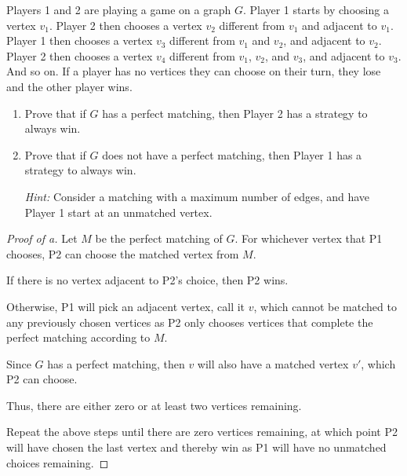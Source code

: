 \documentclass[../hw6]{subfiles}
\begin{document}
\begin{problem}
Players 1 and 2 are playing a game on a graph $G$. Player 1 starts by choosing a vertex $v_1$. Player 2 then chooses a vertex $v_2$ different from $v_1$ and adjacent to $v_1$. Player 1 then chooses a vertex $v_3$ different from $v_1$ and $v_2$, and adjacent to $v_2$. Player 2 then chooses a vertex $v_4$ different from $v_1$, $v_2$, and $v_3$, and adjacent to $v_3$. And so on. If a player has no vertices they can choose on their turn, they lose and the other player wins.
\begin{enumerate}
	\item Prove that if $G$ has a perfect matching, then Player 2 has a strategy to always win.
	\item Prove that if $G$ does not have a perfect matching, then Player 1 has a strategy to always win.

	      \emph{Hint:} Consider a matching with a maximum number of edges, and have Player 1 start at an unmatched vertex.
\end{enumerate}
\end{problem}
\begin{proof}[Proof of a]
	Let $M$ be the perfect matching of  $G$.
	For whichever vertex that P1 chooses, P2 can choose the matched vertex from  $M$.

	If there is no vertex adjacent to P2's choice, then P2 wins.

	Otherwise, P1 will pick an adjacent vertex, call it $v$, which cannot be matched to any previously chosen vertices as P2 only chooses vertices that complete the perfect matching according to $M$.

	Since $G$ has a perfect matching, then $v$ will also have a matched vertex $v'$, which P2 can choose.

	Thus, there are either zero or at least two vertices remaining.

	Repeat the above steps until there are zero vertices remaining, at which point P2 will have chosen the last vertex and thereby win as P1 will have no unmatched choices remaining.
\end{proof}
\end{document}
